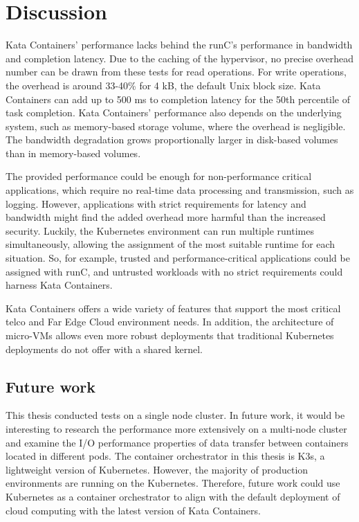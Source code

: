 \chapter{Discussion}
\label{chapter:discussion}

Kata Containers' performance lacks behind the runC's performance in bandwidth and completion latency. Due to the caching of the hypervisor, no precise overhead number can be drawn from these tests for read operations. For write operations, the overhead is around 33-40\% for 4 kB, the default Unix block size. Kata Containers can add up to 500 ms to completion latency for the 50th percentile of task completion. Kata Containers' performance also depends on the underlying system, such as memory-based storage volume, where the overhead is negligible. The bandwidth degradation grows proportionally larger in disk-based volumes than in memory-based volumes.

The provided performance could be enough for non-performance critical applications, which require no real-time data processing and transmission, such as logging. However, applications with strict requirements for latency and bandwidth might find the added overhead more harmful than the increased security. Luckily, the Kubernetes environment can run multiple runtimes simultaneously, allowing the assignment of the most suitable runtime for each situation. So, for example, trusted and performance-critical applications could be assigned with runC, and untrusted workloads with no strict requirements could harness Kata Containers.

Kata Containers offers a wide variety of features that support the most critical telco and Far Edge Cloud environment needs. In addition, the architecture of micro-VMs allows even more robust deployments that traditional Kubernetes deployments do not offer with a shared kernel.

\section{Future work}

This thesis conducted tests on a single node cluster. In future work, it would be interesting to research the performance more extensively on a multi-node cluster and examine the I/O performance properties of data transfer between containers located in different pods. The container orchestrator in this thesis is K3s, a lightweight version of Kubernetes. However, the majority of production environments are running on the Kubernetes. Therefore, future work could use Kubernetes as a container orchestrator to align with the default deployment of cloud computing with the latest version of Kata Containers.


